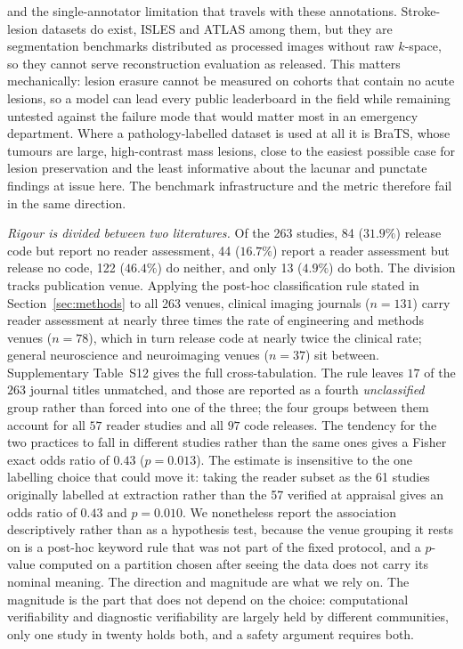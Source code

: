 \documentclass[review,authoryear]{elsarticle}
\begin{document}
and the single-annotator limitation that travels with these annotations. Stroke-lesion
datasets do exist, ISLES
\citep{petzsche2022isles} and ATLAS \citep{liew2022atlas} among them, but they are
segmentation benchmarks distributed as processed images without raw $k$-space, so they
cannot serve reconstruction evaluation as released. This matters mechanically: lesion
erasure cannot be measured on cohorts that contain no acute lesions, so a model can
lead every public leaderboard in the field while remaining untested against the
failure mode that would matter most in an emergency department. Where a
pathology-labelled dataset is used at all it is BraTS, whose tumours are large,
high-contrast mass lesions, close to the easiest possible case for lesion preservation
and the least informative about the lacunar and punctate findings at issue here.
The benchmark infrastructure and the metric therefore fail in the same direction.

\emph{Rigour is divided between two literatures.} Of the 263 studies, 84 ($31.9\%$)
release code but report no reader assessment, 44 ($16.7\%$) report a reader assessment
but release no code, 122 ($46.4\%$) do neither, and only 13 ($4.9\%$) do both. The
division tracks publication venue. Applying the post-hoc classification rule stated
in Section~\ref{sec:methods} to all 263 venues, clinical imaging journals ($n=131$)
carry reader assessment at nearly three times the rate of engineering and methods
venues ($n=78$), which in turn release code at nearly twice the clinical rate;
general neuroscience and neuroimaging venues ($n=37$) sit between. Supplementary
Table~S12 gives the full cross-tabulation. The rule leaves $17$ of the $263$ journal
titles unmatched, and those are reported as a fourth \emph{unclassified} group rather than
forced into one of the three; the four groups between them account for all $57$ reader
studies and all $97$ code releases. The tendency for the two practices to fall in different studies rather
than the same ones gives a Fisher exact odds ratio of $0.43$ ($p=0.013$). The estimate is
insensitive to the one labelling choice that could move it: taking the reader subset as the
61 studies originally labelled at extraction rather than the 57 verified at appraisal gives
an odds ratio of $0.43$ and $p=0.010$. We nonetheless report the association descriptively
rather than as a hypothesis test, because the venue grouping it rests on is a post-hoc
keyword rule that was not part of the fixed protocol, and a $p$-value computed on a
partition chosen after seeing the data does not carry its nominal meaning. The direction and
magnitude are what we rely on. The magnitude is the part that does not depend on the
choice: computational verifiability and diagnostic verifiability are largely held by
different communities, only one study in twenty holds both, and a safety argument
requires both.
\end{document}
